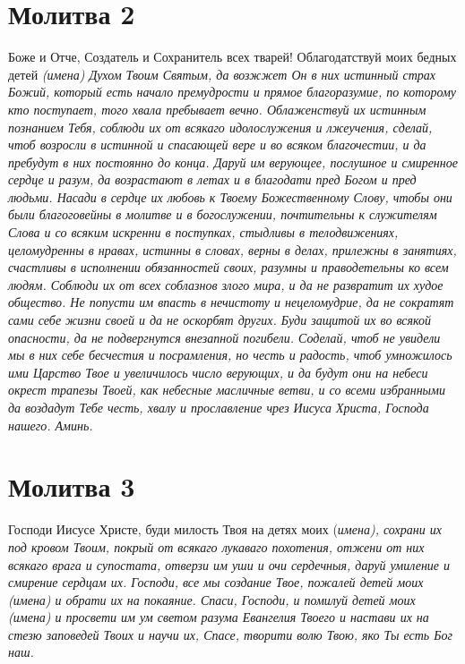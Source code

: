 \section{Молитва 2}
 


Боже и Отче, Создатель и Сохранитель всех тварей! Облагодатствуй моих бедных детей \itshape (имена)\normalfont{} Духом Твоим Святым, да возжжет Он в них истинный страх Божий, который есть начало премудрости и прямое благоразумие, по которому кто поступает, того хвала пребывает вечно. Облаженствуй их истинным познанием Тебя, соблюди их от всякаго идолослужения и лжеучения, сделай, чтоб возросли в истинной и спасающей вере и во всяком благочестии, и да пребудут в них постоянно до конца. Даруй им верующее, послушное и смиренное сердце и разум, да возрастают в летах и в благодати пред Богом и пред людьми. Насади в сердце их любовь к Твоему Божественному Слову, чтобы они были благоговейны в молитве и в богослужении, почтительны к служителям Слова и со всяким искренни в поступках, стыдливы в телодвижениях, целомудренны в нравах, истинны в словах, верны в делах, прилежны в занятиях, счастливы в исполнении обязанностей своих, разумны и праводетельны ко всем людям. Соблюди их от всех соблазнов злого мира, и да не развратит их худое общество. Не попусти им впасть в нечистоту и нецеломудрие, да не сократят сами себе жизни своей и да не оскорбят других. Буди защитой их во всякой опасности, да не подвергнутся внезапной погибели. Соделай, чтоб не увидели мы в них себе бесчестия и посрамления, но честь и радость, чтоб умножилось ими Царство Твое и увеличилось число верующих, и да будут они на небеси окрест трапезы Твоей, как небесные масличные ветви, и со всеми избранными да воздадут Тебе честь, хвалу и прославление чрез Иисуса Христа, Господа нашего. Аминь.


\section{Молитва 3}
 


Господи Иисусе Христе, буди милость Твоя на детях моих (\itshape имена\normalfont{}), сохрани их под кровом Твоим, покрый от всякаго лукаваго похотения, отжени от них всякаго врага и супостата, отверзи им уши и очи сердечныя, даруй умиление и смирение сердцам их. Господи, все мы создание Твое, пожалей детей моих (\itshape имена\normalfont{}) и обрати их на покаяние. Спаси, Господи, и помилуй детей моих (\itshape имена\normalfont{}) и просвети им ум светом разума Евангелия Твоего и настави их на стезю заповедей Твоих и научи их, Спасе, творити волю Твою, яко Ты есть Бог наш.


